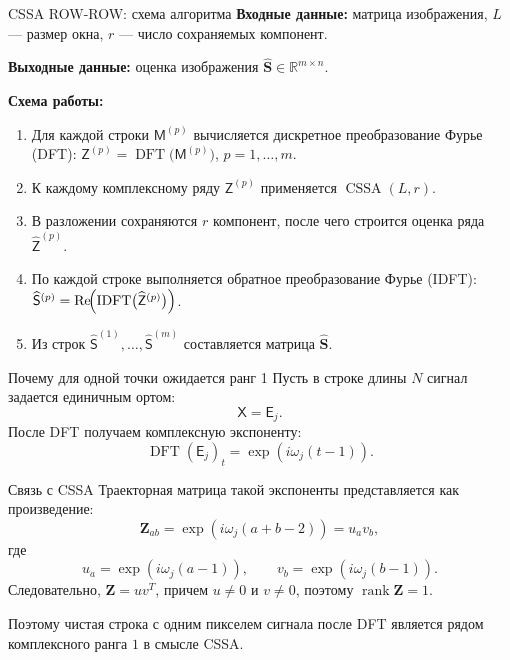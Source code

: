 \documentclass[unicode,notheorems]{beamer}
\begin{document}
\begin{frame}{CSSA ROW-ROW: схема алгоритма}
	\small
	\textbf{Входные данные:} матрица изображения, $L$ --- размер окна, $r$ --- число сохраняемых компонент.

	\textbf{Выходные данные:} оценка изображения $\widehat{\mathbf{S}}\in\mathbb{R}^{m\times n}$.

	\vspace{0.2cm}
	\textbf{Схема работы:}
	\begin{enumerate}
		\item Для каждой строки $\mathsf{M}^{(p)}$ вычисляется дискретное преобразование Фурье (DFT):
		$\mathsf{Z}^{(p)} = \operatorname{DFT}\bigl(\mathsf{M}^{(p)}\bigr)$, $p=1,\dots,m$.
		\item К каждому комплексному ряду $\mathsf{Z}^{(p)}$ применяется $\operatorname{CSSA}(L,r)$.
		\item В разложении сохраняются $r$ компонент, после чего строится оценка ряда $\widehat{\mathsf{Z}}^{(p)}$.
		\item По каждой строке выполняется обратное преобразование Фурье (IDFT):
		$\widehat{\mathsf{S}}^{(p)} = \operatorname{Re}\!\Bigl(\operatorname{IDFT}\bigl(\widehat{\mathsf{Z}}^{(p)}\bigr)\Bigr)$.
		\item Из строк $\widehat{\mathsf{S}}^{(1)},\dots,\widehat{\mathsf{S}}^{(m)}$ составляется матрица $\widehat{\mathbf{S}}$.
	\end{enumerate}
\end{frame}

\begin{frame}[shrink=5]{Почему для одной точки ожидается ранг 1}
	\small
	Пусть в строке длины $N$ сигнал задается единичным ортом:
	\[
	\mathsf{X} = \mathsf{E}_j.
	\]
	После DFT получаем комплексную экспоненту:
	\[
	\operatorname{DFT}(\mathsf{E}_j)_t = \exp(i\omega_j(t-1)).
	\]

	\begin{block}{Связь с CSSA}
		Траекторная матрица такой экспоненты представляется как произведение:
		\[
		\mathbf{Z}_{ab} = \exp(i\omega_j(a+b-2)) = u_a v_b,
		\]
		где
		\[
		u_a=\exp(i\omega_j(a-1)),\qquad
		v_b=\exp(i\omega_j(b-1)).
		\]
		Следовательно, $\mathbf{Z}=uv^{T}$, причем $u\neq0$ и $v\neq0$, поэтому $\operatorname{rank}\mathbf{Z}=1$.
	\end{block}

	Поэтому чистая строка с одним пикселем сигнала после DFT является рядом комплексного ранга $1$ в смысле CSSA.
\end{frame}
\end{document}
